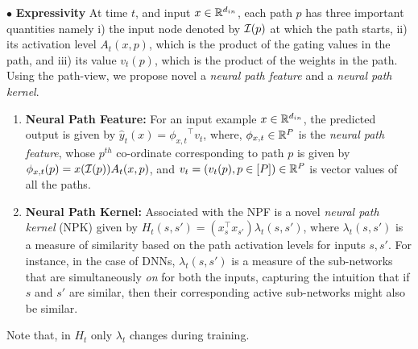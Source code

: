 \documentclass{article}
\begin{document}
$\bullet$ \textbf{Expressivity}  At time $t$, and input $x\in \mathbb{R}^{d_{in}}$, each path $p$ has three important quantities namely i) the input node denoted by $\mathcal{I}(p)$ at which the path starts, ii) its activation level $A_t(x,p)$, which is the product of the gating values in the path, and iii) its value $v_t(p)$, which is the product of the weights in the path. Using the path-view, we propose novel a \emph{neural path feature} and a \emph{neural path kernel}.
\begin{enumerate}
\item \textbf{Neural Path Feature:} For an input example $x\in \mathbb{R}^{d_{in}}$, the predicted output is given by $\hat{y}_t(x)={\phi_{x,t}}^\top v_t$, where, $\phi_{x,t}\in \mathbb{R}^P$ is the \emph{neural path feature}, whose $p^{th}$ co-ordinate corresponding to path $p$ is given by $\phi_{x,t}(p)=x(\mathcal{I}(p))A_t(x,p)$, and $v_t=(v_t(p),p\in[P])\in \mathbb{R}^P$ is vector values of all the paths.
\item \textbf{Neural Path Kernel:} Associated with the NPF is a novel \emph{neural path kernel} (NPK) given by  $H_t(s,s')=(x_s^\top x_{s'})\lambda_t(s,s')$, where $\lambda_t(s,s')$ is a measure of similarity based on the path activation levels for inputs $s,s'$. For instance, in the case of DNNs, $\lambda_t(s,s')$ is a measure of the sub-networks that are simultaneously \emph{on} for both the inputs, capturing the intuition that if $s$ and $s'$ are similar, then their corresponding active sub-networks might also be similar. 

\begin{comment}
\item \textbf{Neural Path Kernel:} For an input example $x_s\in \R^{d_{in}}, s\in [n]$, the output of a DNN can be written as a cumulative summation of the contributions from various paths as \begin{align}\label{eq:npf} \hat{y}_{\Theta_t}(x_s)=\sum_{p} x_s(\I(p))A_t(x_s,p) v_t(p)\end{align}. Using this we can define an $P\times n$ \emph{neural path feature} (NPF) matrix $\Phi_t=\left[\phi_{x_1,t}\ldots,\phi_{x_n,t}\right]$, where $\phi_{x_s,t}=(\phi_{x_s,t}(p),p\in [P])\in \R^P$ with $\phi_{x_s,t}(p)=x_s(\I(p))A_t(x_s,p)$. Letting $v_t=(v_t(p),\p\in[P])\in \R^P$ and $\hat{y}_t=(\hat{y}_{\Theta_t}(x_s),s\in [n])\in \R^n$, the output of the DGN is given by $\hat{y}_t=\Phi_t^\top v_t$. This NPF based representation has the following interesting properties:
\end{comment}
\end{enumerate}
Note that, in $H_t$ only $\lambda_t$ changes during training. 
\end{document}
